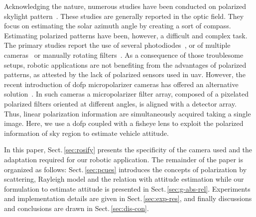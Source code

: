 Acknowledging the nature, numerous studies have been conducted on polarized
skylight pattern~\cite{lambrinos2000insectnavigation, chu2009application,
  zhao2009novel, wang2015novel,chahl2013integration, ashkanazy2015bio,
  sturzl2012fisheye, ma2015skylightpolarization,
  miyazaki09sunlightpolarization, wang2014bionic,
  lu2015angle,hamaoui2017polarized}.  These studies are generally reported in
the optic field. They focus on estimating the solar azimuth angle by creating a
sort of compass.  Estimating polarized patterns have been, however, a difficult
and complex task.  The primary studies report the use of several
photodiodes~\cite{lambrinos2000insectnavigation, chu2009application,
  zhao2009novel, wang2015novel,chahl2013integration}, or of multiple
cameras~\cite{ashkanazy2015bio, sturzl2012fisheye, wang2014bionic} or manually
rotating filters~\cite{ma2015skylightpolarization,
  miyazaki09sunlightpolarization, lu2015angle, hamaoui2017polarized}.  As a
consequence of those troublesome setups, robotic applications are not
benefiting from the advantages of polarized patterns, as attested by the lack
of polarized sensors used in \gls{uav}.  However, the recent introduction of
\gls{dofp} micropolarizer cameras has offered an alternative
solution~\cite{nordin1999micropolarizer, nordin1999diffractive,
  millerd2006pixelated}.  In such cameras a micropolarizer filter array,
composed of a pixelated polarized filters oriented at different angles, is
aligned with a detector array. Thus, linear polarization information are
simultaneously acquired taking a single image. Here, we use a \gls{dofp}
coupled with a fisheye lens to exploit the polarized information of sky region
to estimate vehicle attitude.

In this paper, Sect.\,\ref{sec:rosify} presents the specificity of the camera
used and the adaptation required for our robotic application. The remainder of
the paper is organized as follows: Sect.\,\ref{sec:pcues} introduces the
concepts of polarization by scattering, Rayleigh model and the relation with
attitude estimation while our formulation to estimate attitude is presented in
Sect.\,\ref{sec:g-abs-rel}. Experiments and implementation details are given
in Sect.\,\ref{sec:exp-res}, and finally discussions and conclusions are
drawn in Sect.\,\ref{sec:dis-con}.
























